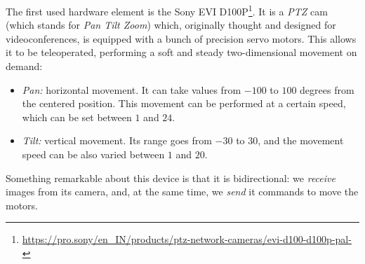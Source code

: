 		The first used hardware element is the Sony EVI D100P\footnote{\url{https://pro.sony/en_IN/products/ptz-network-cameras/evi-d100-d100p-pal-}}. It is a \emph{PTZ} cam (which stands for \emph{Pan Tilt Zoom}) which, originally thought and designed for videoconferences, is equipped with a bunch of precision servo motors. This allows it to be teleoperated, performing a soft and steady two-dimensional movement on demand:
		\begin{itemize}
			\item \emph{Pan:} horizontal movement. It can take values from $-100$ to $100$ degrees from the centered position. This movement can be performed at a certain speed, which can be set between $1$ and $24$.

			\item \emph{Tilt:} vertical movement. Its range goes from $-30$ to $30$, and the movement speed can be also varied between $1$ and $20$.
		\end{itemize}
		
		Something remarkable about this device is that it is bidirectional: we \textit{receive} images from its camera, and, at the same time, we \textit{send} it commands to move the motors.\\
		
